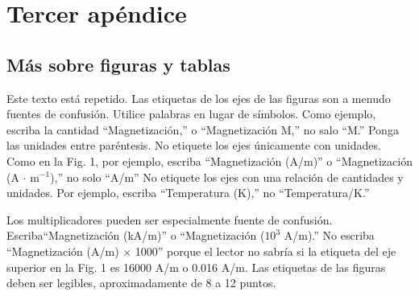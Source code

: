 \documentclass[5p,times,authoryear]{elsarticle}
\begin{document}
\section{Tercer apéndice}

\subsection{Más sobre figuras y tablas}

Este texto está repetido. Las etiquetas de los ejes de las figuras son a menudo fuentes de confusión. Utilice palabras en lugar de símbolos. Como ejemplo, escriba la cantidad ``Magnetización,'' o ``Magnetización M,'' no salo ``M.'' Ponga las unidades entre paréntesis. No etiquete los ejes únicamente con unidades. Como en la Fig. 1, por ejemplo, escriba ``Magnetización (A/m)'' o ``Magnetización (A $\cdot$ m$^{-1}$),'' no solo ``A/m'' No etiquete los ejes con una relación de cantidades y unidades. Por ejemplo, escriba ``Temperatura (K),'' no ``Temperatura/K.''

Los multiplicadores pueden ser especialmente fuente de confusión. Escriba``Magnetización (kA/m)'' o ``Magnetización ($10^3$ A/m).'' No escriba ``Magnetización (A/m) $\times$ 1000'' porque el lector no sabría si la etiqueta del eje superior en la Fig. 1 es 16000 A/m o 0.016 A/m. Las etiquetas de las figuras deben ser legibles, aproximadamente de 8 a 12 puntos.
\end{document}
